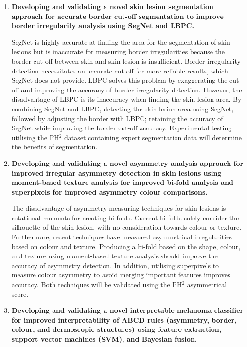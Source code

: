 \begin{enumerate}

\item \textbf{Developing and validating a novel skin lesion segmentation approach for accurate border cut-off segmentation to improve border irregularity analysis using SegNet and LBPC.}

SegNet is highly accurate at finding the area for the segmentation of skin lesions but is inaccurate for measuring border irregularities because the border cut-off between skin and skin lesion is insufficient. Border irregularity detection necessitates an accurate cut-off for more reliable results, which SegNet does not provide. LBPC solves this problem by exaggerating the cut-off and improving the accuracy of border irregularity detection. However, the disadvantage of LBPC is its inaccuracy when finding the skin lesion area. By combining SegNet and LBPC, detecting the skin lesion area using SegNet, followed by adjusting the border with LBPC; retaining the accuracy of SegNet while improving the border cut-off accuracy. Experimental testing utilising the PH$^2$ dataset containing expert segmentation data will determine the benefits of segmentation.

\item \textbf{Developing and validating a novel asymmetry analysis approach for improved irregular asymmetry detection in skin lesions using moment-based texture analysis for improved bi-fold analysis and superpixels for improved asymmetry colour comparisons.}

The disadvantage of asymmetry measuring techniques for skin lesions is rotational moments for creating bi-folds. Current bi-folds solely consider the silhouette of the skin lesion, with no consideration towards colour or texture. Furthermore, recent techniques have measured asymmetrical irregularities based on colour and texture. Producing a bi-fold based on the shape, colour, and texture using moment-based texture analysis should improve the accuracy of asymmetry detection. In addition, utilising superpixels to measure colour asymmetry to avoid merging important features improves accuracy. Both techniques will be validated using the PH$^2$ asymmetrical score.  

\item \textbf{Developing and validating a novel interpretable melanoma classifier for improved interpretability of ABCD rules (asymmetry, border, colour, and dermoscopic structures) using feature extraction, support vector machines (SVM), and Bayesian fusion.}


\end{enumerate}
